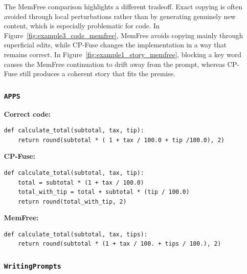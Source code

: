 The MemFree comparison highlights a different tradeoff. Exact copying is often avoided through local perturbations rather than by generating genuinely new content, which is especially problematic for code. In Figure~\ref{fig:example3_code_memfree}, MemFree avoids copying mainly through superficial edits, while CP-Fuse changes the implementation in a way that remains correct. In Figure~\ref{fig:example1_story_memfree}, blocking a key word causes the MemFree continuation to drift away from the prompt, whereas CP-Fuse still produces a coherent story that fits the premise.

\subsubsection*{\texttt{APPS}}

\begin{breakablefigure}
    \centering
    \begin{promptmdfthreemem}
        \textbf{Correct code:}
    \begin{lstlisting}[style=cpfusecode]
def calculate_total(subtotal, tax, tip):
    return round(subtotal * ( 1 + tax / 100.0 + tip /100.0), 2)
        \end{lstlisting}
        \textbf{CP-Fuse:}
        \begin{lstlisting}[style=cpfusecode]
def calculate_total(subtotal, tax, tip):
    total = subtotal * (1 + tax / 100.0)
    total_with_tip = total + subtotal * (tip / 100.0)
    return round(total_with_tip, 2)
        \end{lstlisting}
        \textbf{MemFree:}
        \begin{lstlisting}[style=cpfusecode]
def calculate_total(subtotal, tax, tips):
    return round(subtotal * (1 + tax / 100. + tips / 100.), 2)
        \end{lstlisting}
    \end{promptmdfthreemem}
    \label{fig:example3_code_memfree}
\end{breakablefigure}



\FloatBarrier

\subsubsection*{\texttt{WritingPrompts}}

